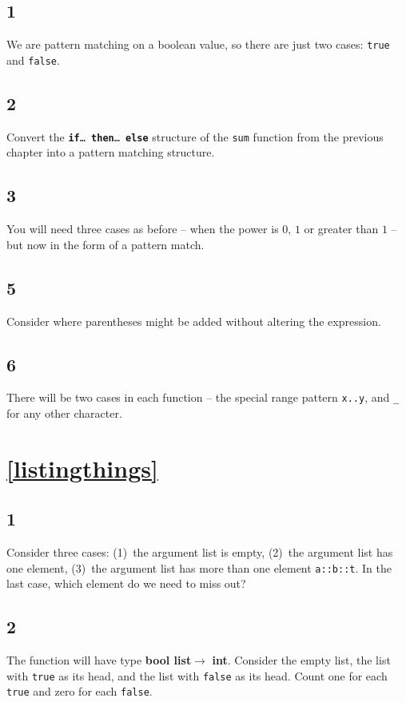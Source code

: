 \documentclass[]{book}
\newcommand{\pif}{\textbf{if}\xspace}
\newcommand{\pthen}{\textbf{then}\xspace}
\newcommand{\pelse}{\textbf{else}\xspace}
\begin{document}
\subsection*{1}
We are pattern matching on a boolean value, so there are just two cases: \texttt{true} and \texttt{false}.
\subsection*{2}
Convert the \texttt{\pif\ldots\ \pthen\ldots\ \pelse} structure of the \texttt{sum} function from the previous chapter into a pattern matching structure.
\subsection*{3}
You will need three cases as before -- when the power is $0$, $1$ or greater than $1$ -- but now in the form of a pattern match.
\subsection*{5}
Consider where parentheses might be added without altering the expression.
\subsection*{6}
There will be two cases in each function -- the special range pattern \texttt{x..y}, and \texttt{\_} for any other character.

\section*{\ref{listingthings}\\ }
\subsection*{1}
Consider three cases: (1)~the argument list is empty, (2)~the argument list has one element, (3)~the argument list has more than one element \texttt{a::b::t}. In the last case, which element do we need to miss out?
\subsection*{2}
The function will have type \textrm{\textbf{bool list}}$ \rightarrow$ \textrm{\textbf{int}}. Consider the empty list, the list with \texttt{true} as its head, and the list with \texttt{false} as its head. Count one for each \texttt{true} and zero for each \texttt{false}.
\end{document}
